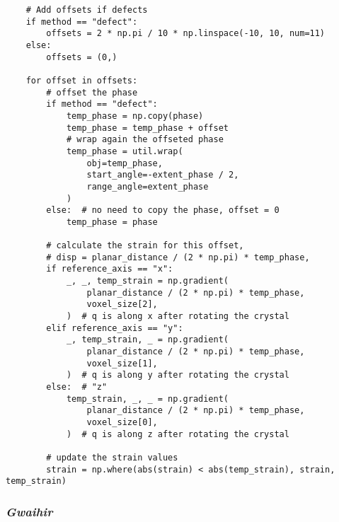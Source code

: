 \begin{verbatim}
    # Add offsets if defects
    if method == "defect":
        offsets = 2 * np.pi / 10 * np.linspace(-10, 10, num=11)
    else:
        offsets = (0,)
        
    for offset in offsets:
        # offset the phase
        if method == "defect":
            temp_phase = np.copy(phase)
            temp_phase = temp_phase + offset
            # wrap again the offseted phase
            temp_phase = util.wrap(
                obj=temp_phase,
                start_angle=-extent_phase / 2,
                range_angle=extent_phase
            )
        else:  # no need to copy the phase, offset = 0
            temp_phase = phase

        # calculate the strain for this offset,
        # disp = planar_distance / (2 * np.pi) * temp_phase,
        if reference_axis == "x":
            _, _, temp_strain = np.gradient(
                planar_distance / (2 * np.pi) * temp_phase,
                voxel_size[2],
            )  # q is along x after rotating the crystal
        elif reference_axis == "y":
            _, temp_strain, _ = np.gradient(
                planar_distance / (2 * np.pi) * temp_phase,
                voxel_size[1],
            )  # q is along y after rotating the crystal
        else:  # "z"
            temp_strain, _, _ = np.gradient(
                planar_distance / (2 * np.pi) * temp_phase,
                voxel_size[0],
            )  # q is along z after rotating the crystal

        # update the strain values
        strain = np.where(abs(strain) < abs(temp_strain), strain, temp_strain)
\end{verbatim}


\subsubsection{\textit{Gwaihir}}